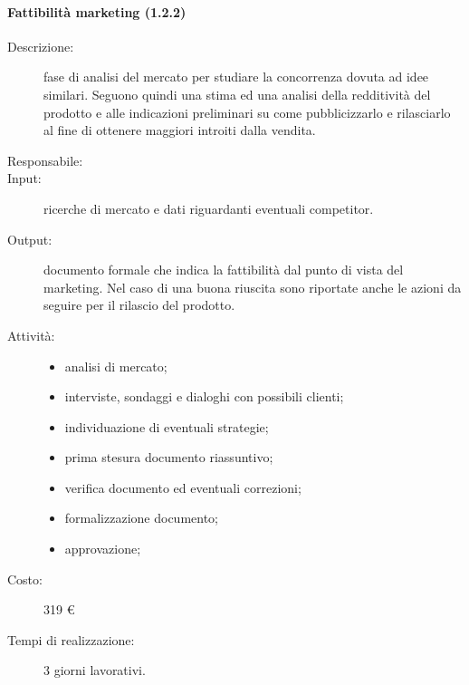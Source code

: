 \paragraph{Fattibilit\`{a} marketing (1.2.2)}
\begin{description}
\item[Descrizione:] fase di analisi del mercato per studiare la concorrenza dovuta ad idee similari. Seguono quindi una stima ed una analisi della redditivit\`{a} del prodotto e alle indicazioni preliminari su come pubblicizzarlo e rilasciarlo al fine di ottenere maggiori introiti dalla vendita.
\item[Responsabile:] 
\item[Input:] ricerche di mercato e dati riguardanti eventuali competitor.
\item[Output:] documento formale che indica la fattibilit\`{a} dal punto di vista del marketing. Nel caso di una buona riuscita sono riportate anche le azioni da seguire per il rilascio del prodotto.
\item[Attivit\`{a}:] 
\begin{center}
\begin{itemize}
\item analisi di mercato;
\item interviste, sondaggi e dialoghi con possibili clienti;
\item individuazione di eventuali strategie;
\item prima stesura documento riassuntivo;
\item verifica documento ed eventuali correzioni;
\item formalizzazione documento;
\item approvazione;
\end{itemize}
\end{center}
\item[Costo:] 319 \euro{}
\item[Tempi di realizzazione:] 3 giorni lavorativi.
\end{description}

